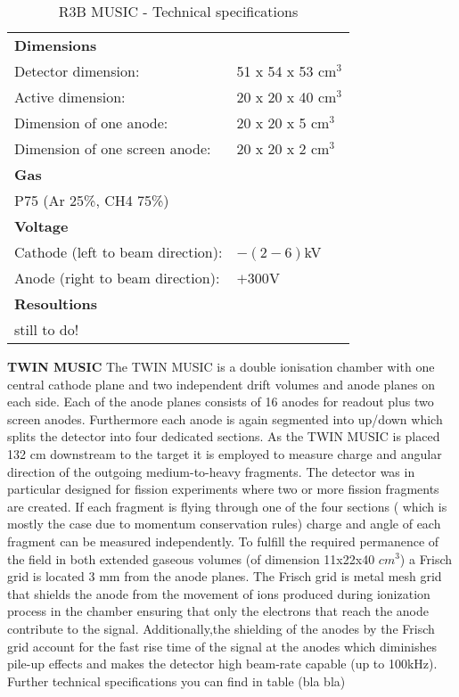 \begin{table}[h!]
    \centering
    \begin{tabular}{ll}
        \hline
        \textbf{Dimensions} & \\ 
	Detector dimension: & 51 x 54 x 53 cm$^3$ \\ 
	Active dimension: & 20 x 20 x 40 cm$^3$\\
	Dimension of one anode:& 20 x 20 x 5 cm$^3$\\
	Dimension of one screen anode:& 20 x 20 x 2 cm$^3$\\
	\textbf{Gas} &\\
	P75 (Ar 25\%, CH4 75\%) \\
	\textbf{Voltage} & \\
	Cathode (left to beam direction): &  $-(2-6)$kV \\
	Anode (right to beam direction): & $+300$V \\
	\textbf{Resoultions} & \\
	still to do! & \\
	\hline
    \end{tabular}
    \caption{R3B MUSIC - Technical specifications}
	\label{table:r3bmusic_tecs}
\end{table}
\newline
\textbf{TWIN MUSIC}\newline
The TWIN MUSIC is a double ionisation chamber with one central cathode plane and two independent drift volumes and anode planes on each side. Each of the anode planes consists of 16 anodes for readout plus two screen anodes. Furthermore each anode is again segmented into up/down which splits the detector into four dedicated sections. As the TWIN MUSIC is placed 132 cm downstream to the target it is employed to measure charge and angular direction of the outgoing medium-to-heavy fragments. The detector was in particular designed for fission experiments where two or more fission fragments are created. If each fragment is flying through one of the four sections ( which is mostly the case due to momentum conservation rules) charge and angle of each fragment can be measured independently.\newline
To fulfill the required permanence of the field in both extended gaseous volumes (of dimension 11x22x40 $cm^3$) a Frisch grid is located 3 mm from the anode planes. The Frisch grid is metal mesh grid that shields the anode from the movement of ions produced during ionization process in the chamber ensuring that only the electrons that reach the anode contribute to the signal. Additionally,the shielding of the anodes by the Frisch grid account for the fast rise time of the signal at the anodes which diminishes pile-up effects and makes the detector high beam-rate capable (up to 100kHz). Further technical specifications you can find in table (bla bla)
